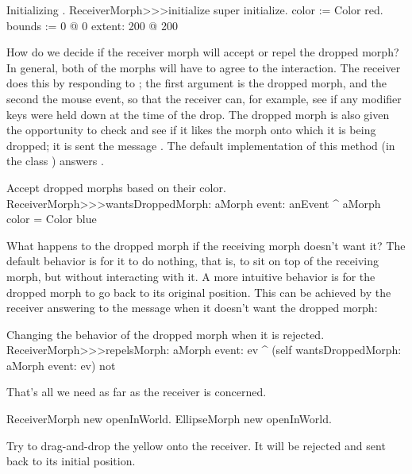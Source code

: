 \documentclass[a4paper,10pt,twoside]{book}
\begin{document}
\begin{method}{Initializing .}
ReceiverMorph>>>initialize
	super initialize.
	color := Color red.
	bounds := 0 @ 0 extent: 200 @ 200
\end{method}

How do we decide if the receiver morph will accept or repel the dropped morph?
In general, both of the morphs will have to agree to the interaction.
The receiver does this by responding to ; the first argument is the dropped morph, and the second the mouse event, so that the receiver can, for example, see if any modifier keys were held down at the time of the drop. 
The dropped morph is also given the opportunity to check and see if it likes the morph onto which it is being dropped; it is sent the message .
The default implementation of this method (in the class ) answers .

\begin{method}{Accept dropped morphs based on their color.}
ReceiverMorph>>>wantsDroppedMorph: aMorph event: anEvent
	^ aMorph color = Color blue
\end{method}

What happens to the dropped morph if the receiving morph doesn't want it?
The default behavior is for it to do nothing, that is, to sit on top of the receiving morph, but without interacting with it.
A more intuitive behavior is for the dropped morph to go back to its original position.
This can be achieved by the receiver answering  to the message  when it doesn't want the dropped morph:

\begin{method}{Changing the behavior of the dropped morph when it is rejected.}
ReceiverMorph>>>repelsMorph: aMorph event: ev
	^ (self wantsDroppedMorph: aMorph event: ev) not
\end{method}

That's all we need as far as the receiver is concerned.

\begin{code}{}
ReceiverMorph new openInWorld.
EllipseMorph new openInWorld.
\end{code}
\noindent
Try to drag-and-drop the yellow  onto the receiver.
It will be rejected and sent back to its initial position.
\end{document}
